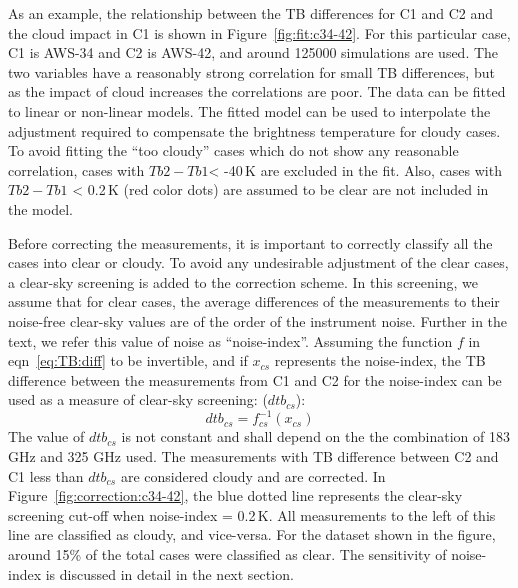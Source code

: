 \documentclass[12pt]{article}
\begin{document}
As an example, the relationship between the TB differences for C1 and C2 and the cloud impact in C1 is shown in  Figure~\ref{fig:fit:c34-42}. For this particular case, C1 is AWS-34 and C2 is AWS-42, and around 125000 simulations are used. The two variables have a reasonably strong correlation for small TB differences, but as the impact of cloud increases the correlations are poor. The data can be fitted to linear or non-linear models. The fitted model can be used to interpolate the adjustment required to compensate the brightness temperature for cloudy cases. To avoid fitting the ``too cloudy'' cases which do not show any reasonable correlation, cases with $Tb2-Tb1$< -40\,K  are excluded in the fit. Also, cases with $Tb2-Tb1$ < 0.2\,K (red color dots) are assumed to be clear are not included in the model.

Before correcting the measurements, it is important to correctly classify all the cases into clear or cloudy. To avoid any undesirable adjustment of the clear cases, a clear-sky screening is added  to the correction scheme. In this screening, we assume that for clear cases, the average differences of the measurements to their noise-free clear-sky values are of the order of the instrument noise. Further in the text, we refer this value of noise as ``noise-index''. Assuming the function $f$ in eqn~\ref{eq:TB:diff} to be invertible, and if $x_{cs}$  represents the noise-index, the TB difference between the measurements from C1 and C2 for the noise-index can be used as a measure of clear-sky screening: ($dtb_{cs}$):
\begin{equation}
dtb_{cs}= f_{cs}^{-1}(x_{cs}) 
\label{eq:dtb}
\end{equation}
The value of $dtb_{cs}$ is not constant and shall depend on the the combination of 183 GHz and 325 GHz used. The measurements with TB difference between C2 and C1 less than $dtb_{cs}$ are considered cloudy and are corrected. In Figure~\ref{fig:correction:c34-42}, the blue dotted line represents the clear-sky screening cut-off when noise-index = 0.2\,K. All measurements to the left of this line are classified as cloudy, and vice-versa. For the dataset shown in the figure, around 15\% of the total cases were classified as clear. The sensitivity of noise-index is discussed in detail in the next section. 
\end{document}
